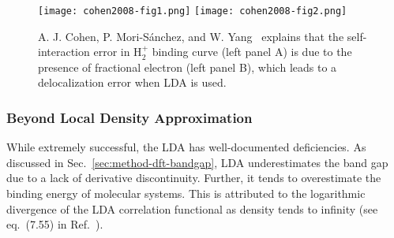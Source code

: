 \begin{figure}[h]
\texttt{[image: cohen2008-fig1.png]}
\texttt{[image: cohen2008-fig2.png]}
\caption{A. J. Cohen, P. Mori-S\'anchez, and W. Yang~\cite{Cohen2008} explains that the self-interaction error in H$_2^+$ binding curve (left panel A) is due to the presence of fractional electron (left panel B), which leads to a delocalization error when LDA is used.}
\label{fig:method-dft-smooth-lda}
\end{figure}


\subsubsection{Beyond Local Density Approximation}

While extremely successful, the LDA has well-documented deficiencies.
As discussed in Sec.~\ref{sec:method-dft-bandgap}, LDA underestimates the band gap due to a lack of derivative discontinuity.
Further, it tends to overestimate the binding energy of molecular systems. This is attributed to the logarithmic divergence of the LDA correlation functional as density tends to infinity (see eq.~(7.55) in Ref.~\cite{Giuliani2005}).

